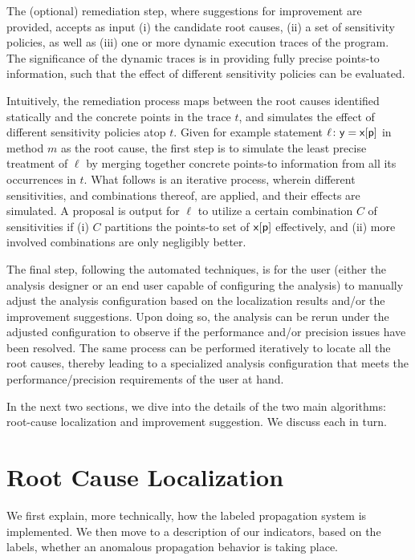 The (optional) remediation step, where suggestions for improvement are provided, accepts as input (i) the candidate root causes, (ii) a set of sensitivity policies, as well as (iii) one or more dynamic execution traces of the program. The significance of the dynamic traces is in providing fully precise points-to information, such that the effect of different sensitivity policies can be evaluated.

Intuitively, the remediation process maps between the root causes identified statically and the concrete points in the trace $t$, and simulates the effect of different sensitivity policies atop $t$. Given for example statement $\ell\colon {\sf y=x[p]}$ in method $m$ as the root cause, the first step is to simulate the least precise treatment of $\ell$ by merging together concrete points-to information from all its occurrences in $t$. What follows is an iterative process, wherein different sensitivities, and combinations thereof, are applied, and their effects are simulated. A proposal is output for $\ell$ to utilize a certain combination $C$ of sensitivities if (i) $C$ partitions the points-to set of ${\sf x[p]}$ effectively, and (ii) more involved combinations are only negligibly better.

The final step, following the automated techniques, is for the user (either the analysis designer or an end user capable of configuring the analysis) to manually adjust the analysis configuration based on the localization results and/or the improvement suggestions. Upon doing so, the analysis can be rerun under the adjusted configuration to observe if the performance and/or precision issues have been resolved. The same process can be performed iteratively to locate all the root causes, thereby leading to a specialized analysis configuration that meets the performance/precision requirements of the user at hand.

In the next two sections, we dive into the details of the two main algorithms: root-cause localization and improvement suggestion. We discuss each in turn.

\section{Root Cause Localization}\label{Se:RootCause}

We first explain, more technically, how the labeled propagation system is implemented. We then move to a description of our indicators, based on the labels, whether an anomalous propagation behavior is taking place.

